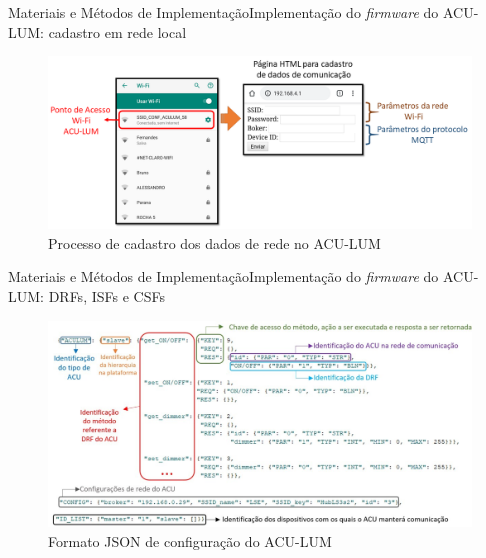 \begin{frame}{Materiais e Métodos de Implementação}{Implementação do \textit{firmware} do ACU-LUM:  cadastro em rede local}
\vspace{-0.64cm}
\begin{figure}[htp]
	\centering
	\caption{ \centering\small{{Processo de cadastro dos dados de rede no ACU-LUM}}}
	\includegraphics[width=1\linewidth]{img/AP_ESP32.png}
    \hspace{1cm}
\end{figure}
\end{frame}

\begin{frame}{Materiais e Métodos de Implementação}{Implementação do \textit{firmware} do ACU-LUM: DRFs, ISFs e CSFs}
\vspace{-0.64cm}
\begin{figure}[htp]
	\centering
	\caption{ \centering\small{{Formato JSON de configuração do ACU-LUM}}}
	\includegraphics[width=1\linewidth]{img/exjsonLUM.jpg}
    \hspace{1cm}
\end{figure}
\end{frame}

